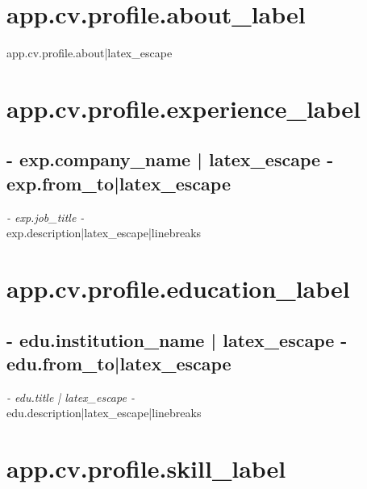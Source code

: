 \documentclass[a4paper, {{- app.cv.latex_pt -}}pt]{report}
\begin{document}
{{{%
\space
\section*{ {{ app.cv.profile.about_label }} }
{{ app.cv.profile.about|latex_escape }}
{%


{%
\section*{ {{ app.cv.profile.experience_label }} }
{%
\subsection*{ {{- exp.company_name | latex_escape -}} \hfill {{ exp.from_to|latex_escape }}  }
\textit{ {{- exp.job_title -}} } \vspace{3mm} \\
{{ exp.description|latex_escape|linebreaks }}
{%
{%

{%
\section*{ {{ app.cv.profile.education_label }}}
{%
\subsection*{ {{- edu.institution_name | latex_escape -}} \hfill {{ edu.from_to|latex_escape }} }
\textit{ {{- edu.title | latex_escape -}} } \vspace{3mm} \\
{{ edu.description|latex_escape|linebreaks }}
{%
{%

{%
\section*{ {{ app.cv.profile.skill_label }}}
\begin{center}
\end{center}
{%

}}}}}}}}}}}}}}
\end{document}
